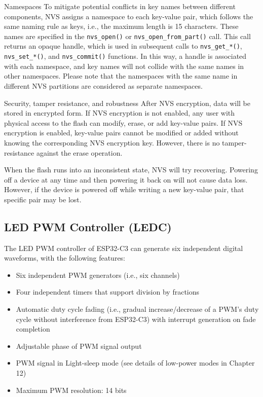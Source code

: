 \documentclass[a4paper,12pt]{book}
\begin{document}
\begin{term}{Namespaces}
    To mitigate potential conflicts in key names between different components, NVS assigns a namespace to each key-value pair, which follows the same naming rule as keys, i.e., the maximum length is 15 characters. These names are specified in the \verb|nvs_open()| or \verb|nvs_open_from_part()| call. This call returns an opaque handle, which is used in subsequent calls to \verb|nvs_get_*()|, \verb|nvs_set_*()|, and \verb|nvs_commit()| functions. In this way, a handle is associated with each namespace, and key names will not collide with the same names in other namespaces. Please note that the namespaces with the same name in different NVS partitions are considered as separate namespaces.
\end{term}

\begin{term}{Security, tamper resistance, and robustness}
    After NVS encryption, data will be stored in encrypted form. If NVS encryption is not enabled, any user with physical access to the flash can modify, erase, or add key-value pairs. If NVS encryption is enabled, key-value pairs cannot be modified or added without knowing the corresponding NVS encryption key. However, there is no tamper-resistance against the erase operation.

    \vspace{6pt}
    When the flash runs into an inconsistent state, NVS will try recovering. Powering off a device at any time and then powering it back on will not cause data loss. However, if the device is powered off while writing a new key-value pair, that specific pair may be lost.
\end{term}

\subsection{LED PWM Controller (LEDC)}
The LED PWM controller of ESP32-C3 can generate six independent digital waveforms, with the following features:

\begin{itemize}[noitemsep]
    \item Six independent PWM generators (i.e., six channels)
    \item Four independent timers that support division by fractions
    \item Automatic duty cycle fading (i.e., gradual increase/decrease of a PWM’s duty cycle without interference from ESP32-C3) with interrupt generation on fade completion
    \item Adjustable phase of PWM signal output
    \item PWM signal in Light-sleep mode (see details of low-power modes in Chapter 12)
    \item Maximum PWM resolution: 14 bits
\end{itemize}
\end{document}
